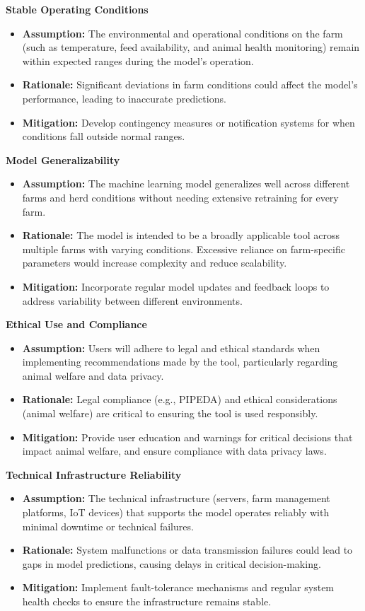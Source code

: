 \documentclass{article}
\begin{document}
\textbf{Stable Operating Conditions}
\begin{itemize}
    \item \textbf{Assumption:} The environmental and operational conditions on 
    the farm (such as temperature, feed availability, and animal health 
    monitoring) remain within expected ranges during the model's operation.
    \item \textbf{Rationale:} Significant deviations in farm conditions could 
    affect the model's performance, leading to inaccurate predictions.
    \item \textbf{Mitigation:} Develop contingency measures or notification 
    systems for when conditions fall outside normal ranges.
\end{itemize}

\textbf{Model Generalizability}
\begin{itemize}
    \item \textbf{Assumption:} The machine learning model generalizes well 
    across different farms and herd conditions without needing extensive 
    retraining for every farm.
    \item \textbf{Rationale:} The model is intended to be a broadly applicable 
    tool across multiple farms with varying conditions. Excessive reliance on 
    farm-specific parameters would increase complexity and reduce scalability.
    \item \textbf{Mitigation:} Incorporate regular model updates and feedback 
    loops to address variability between different environments.
\end{itemize}

\textbf{Ethical Use and Compliance}
\begin{itemize}
    \item \textbf{Assumption:} Users will adhere to legal and ethical standards 
    when implementing recommendations made by the tool, particularly regarding 
    animal welfare and data privacy.
    \item \textbf{Rationale:} Legal compliance (e.g., PIPEDA) and ethical 
    considerations (animal welfare) are critical to ensuring the tool is used 
    responsibly.
    \item \textbf{Mitigation:} Provide user education and warnings for critical 
    decisions that impact animal welfare, and ensure compliance with data privacy laws.
\end{itemize}

\textbf{Technical Infrastructure Reliability}
\begin{itemize}
    \item \textbf{Assumption:} The technical infrastructure (servers, farm 
    management platforms, IoT devices) that supports the model operates 
    reliably with minimal downtime or technical failures.
    \item \textbf{Rationale:} System malfunctions or data transmission failures 
    could lead to gaps in model predictions, causing delays in critical 
    decision-making.
    \item \textbf{Mitigation:} Implement fault-tolerance mechanisms and 
    regular system health checks to ensure the infrastructure remains stable.
\end{itemize}
\end{document}
